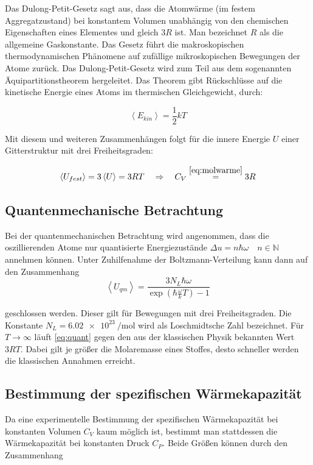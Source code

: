 Das Dulong-Petit-Gesetz sagt aus, dass die Atomwärme (im festem Aggregatzustand) bei %
konstantem Volumen unabhängig von den chemischen Eigenschaften eines Elementes
und gleich $3R$ ist. %
Man bezeichnet $R$ als die allgemeine Gaskonstante. %
Das Gesetz führt die makroskopischen thermodynamischen Phänomene
auf zufällige mikroskopischen Bewegungen der Atome zurück. %
Das Dulong-Petit-Gesetz wird zum Teil aus dem %
sogenannten Äquipartitionstheorem hergeleitet.
Das Theorem gibt Rückschlüsse auf die kinetische Energie eines Atoms %
im thermischen Gleichgewicht, durch:

\begin{equation*}
\left< E_{kin} \right>=\frac{1}{2}kT
\end{equation*}

Mit diesem und weiteren Zusammenhängen folgt für die innere Energie $U$ %
einer Gitterstruktur mit drei Freiheitsgraden:

\begin{equation*}
\left< U_{fest} \right> = 3 \left< U \right>=3RT \quad \Rightarrow \quad C_{V}\overset{\eqref{eq:molwarme}}{=}3R
\end{equation*}

\subsection{Quantenmechanische Betrachtung}
Bei der quantenmechanischen Betrachtung wird angenommen,
dass die oszillierenden Atome nur quantisierte Energiezustände $\Delta u=n\hbar \omega \quad n\in\mathbb{N}$
annehmen können.
Unter Zuhilfenahme der Boltzmann-Verteilung kann dann auf den Zusammenhang  %
\begin{equation}
\label{eq:quant}
\left< U_{qm} \right> =\frac{3N_L \hbar \omega}{\exp\left(\hbar \frac{\omega}{k} T\right) -1}
\end{equation}

geschlossen werden. Dieser gilt für Bewegungen mit drei Freiheitsgraden.
Die Konstante $N_L = \SI{6.02e23}{\per\mol}$ wird als Loschmidtsche Zahl bezeichnet.
Für $T\to\infty$ läuft \eqref{eq:quant} gegen den aus der klassischen Physik bekannten Wert %
$3RT$.
Dabei gilt je größer die Molaremasse eines Stoffes, desto schneller werden die klassischen Annahmen erreicht.

\subsection{Bestimmung der spezifischen Wärmekapazität}
Da eine experimentelle Bestimmung der spezifischen Wärmekapazität
bei konstanten Volumen $C_V$ kaum möglich ist, %
bestimmt man stattdessen die Wärmekapazität bei konstanten Druck $C_P$. %
Beide Größen können durch den Zusammenhang %

